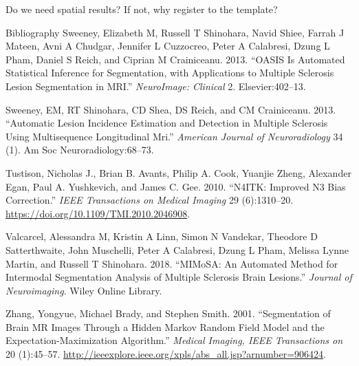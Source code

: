 \documentclass[ignorenonframetext,]{beamer}
\begin{document}
\begin{frame}[fragile]{Do we need spatial results? If not, why register
to the template?}
\begin{block}{Bibliography}
\leavevmode\hypertarget{ref-oasis}{}%
Sweeney, Elizabeth M, Russell T Shinohara, Navid Shiee, Farrah J Mateen,
Avni A Chudgar, Jennifer L Cuzzocreo, Peter A Calabresi, Dzung L Pham,
Daniel S Reich, and Ciprian M Crainiceanu. 2013. “OASIS Is Automated
Statistical Inference for Segmentation, with Applications to Multiple
Sclerosis Lesion Segmentation in MRI.” \emph{NeuroImage: Clinical} 2.
Elsevier:402–13.

\leavevmode\hypertarget{ref-sublime}{}%
Sweeney, EM, RT Shinohara, CD Shea, DS Reich, and CM Crainiceanu. 2013.
“Automatic Lesion Incidence Estimation and Detection in Multiple
Sclerosis Using Multisequence Longitudinal Mri.” \emph{American Journal
of Neuroradiology} 34 (1). Am Soc Neuroradiology:68–73.

\leavevmode\hypertarget{ref-tustison_n4itk_2010}{}%
Tustison, Nicholas J., Brian B. Avants, Philip A. Cook, Yuanjie Zheng,
Alexander Egan, Paul A. Yushkevich, and James C. Gee. 2010. “N4ITK:
Improved N3 Bias Correction.” \emph{IEEE Transactions on Medical
Imaging} 29 (6):1310–20. \url{https://doi.org/10.1109/TMI.2010.2046908}.

\leavevmode\hypertarget{ref-mimosa}{}%
Valcarcel, Alessandra M, Kristin A Linn, Simon N Vandekar, Theodore D
Satterthwaite, John Muschelli, Peter A Calabresi, Dzung L Pham, Melissa
Lynne Martin, and Russell T Shinohara. 2018. “MIMoSA: An Automated
Method for Intermodal Segmentation Analysis of Multiple Sclerosis Brain
Lesions.” \emph{Journal of Neuroimaging}. Wiley Online Library.

\leavevmode\hypertarget{ref-fast}{}%
Zhang, Yongyue, Michael Brady, and Stephen Smith. 2001. “Segmentation of
Brain MR Images Through a Hidden Markov Random Field Model and the
Expectation-Maximization Algorithm.” \emph{Medical Imaging, IEEE
Transactions on} 20 (1):45–57.
\url{http://ieeexplore.ieee.org/xpls/abs_all.jsp?arnumber=906424}.

\end{block}

\end{frame}
\end{document}
